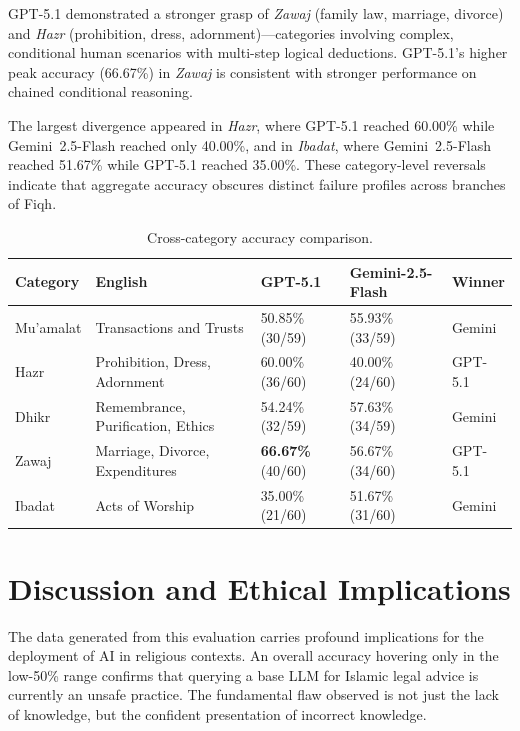 \documentclass[runningheads]{llncs}
\begin{document}
GPT-5.1 demonstrated a stronger grasp of \textit{Zawaj} (family law, marriage, divorce) and \textit{Hazr} (prohibition, dress, adornment)---categories involving complex, conditional human scenarios with multi-step logical deductions. GPT-5.1's higher peak accuracy (66.67\%) in \textit{Zawaj} is consistent with stronger performance on chained conditional reasoning.

The largest divergence appeared in \textit{Hazr}, where GPT-5.1 reached 60.00\% while Gemini~2.5-Flash reached only 40.00\%, and in \textit{Ibadat}, where Gemini~2.5-Flash reached 51.67\% while GPT-5.1 reached 35.00\%. These category-level reversals indicate that aggregate accuracy obscures distinct failure profiles across branches of Fiqh.

\begin{table}[t]
\centering
\caption{Cross-category accuracy comparison.}
\label{tab:categories}
\setlength{\tabcolsep}{3pt}
\footnotesize
\begin{tabular}{p{1.7cm} p{3.0cm} p{2.1cm} p{2.4cm} p{1.4cm}}
\toprule
\textbf{Category} & \textbf{English} & \textbf{GPT-5.1} & \textbf{Gemini-2.5-Flash} & \textbf{Winner} \\
\midrule
Mu'amalat & Transactions and Trusts           & 50.85\% (30/59)          & 55.93\% (33/59)          & Gemini \\
Hazr      & Prohibition, Dress, Adornment     & 60.00\% (36/60)          & 40.00\% (24/60)          & GPT-5.1 \\
Dhikr     & Remembrance, Purification, Ethics & 54.24\% (32/59)          & 57.63\% (34/59)          & Gemini \\
Zawaj     & Marriage, Divorce, Expenditures   & \textbf{66.67\%} (40/60) & 56.67\% (34/60)          & GPT-5.1 \\
Ibadat    & Acts of Worship                   & 35.00\% (21/60)          & 51.67\% (31/60)          & Gemini \\
\bottomrule
\end{tabular}
\end{table}

\section{Discussion and Ethical Implications}

The data generated from this evaluation carries profound implications for the deployment of AI in religious contexts. An overall accuracy hovering only in the low-50\% range confirms that querying a base LLM for Islamic legal advice is currently an unsafe practice. The fundamental flaw observed is not just the lack of knowledge, but the confident presentation of incorrect knowledge.
\end{document}
